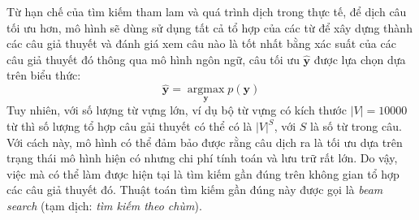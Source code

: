 Từ hạn chế của tìm kiếm tham lam và quá trình dịch trong thực tế, để dịch câu tối ưu hơn, mô hình sẽ dùng sử dụng tất cả tổ hợp của các từ để xây dựng thành các câu giả thuyết và đánh giá xem câu nào là tốt nhất bằng xác suất của các câu giả thuyết đó thông qua mô hình ngôn ngữ, câu tối ưu $\bm{\hat{y}}$ được lựa chọn dựa trên biểu thức:
\begin{equation*}
\bm{\hat{y}} = \operatorname*{argmax}_{\bm{y}} p(\bm{y})
\end{equation*}
Tuy nhiên, với số lượng từ vựng lớn, ví dụ bộ từ vựng có kích thước $|V| = 10000$ từ thì số lượng tổ hợp câu gải thuyết có thể có là $|V|^S$, với $S$ là số từ trong câu. Với cách này, mô hình có thể đảm bảo được rằng câu dịch ra là tối ưu dựa trên trạng thái mô hình hiện có nhưng chi phí tính toán và lưu trữ rất lớn. Do vậy, việc mà có thể làm được hiện tại là tìm kiếm gần đúng trên không gian tổ hợp các câu giả thuyết đó. Thuật toán tìm kiếm gần đúng này được gọi là \textit{beam search} (tạm dịch: \textit{tìm kiếm theo chùm}).

